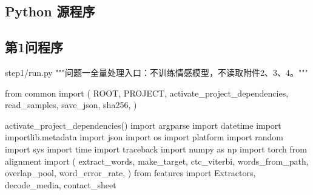 
\clearpage
\begin{appendices}

\section{Python 源程序}
\label{app:tail-code}
\renewcommand{\thesubsection}{\Alph{section}\thinspace.\thinspace\arabic{subsection}}

\subsection{第1问程序}
\vspace{-2ex}

\begin{Python}{step1/run.py}
"""问题一全量处理入口：不训练情感模型，不读取附件2、3、4。"""

from common import (
    ROOT,
    PROJECT,
    activate_project_dependencies,
    read_samples,
    save_json,
    sha256,
)

activate_project_dependencies()
import argparse
import datetime
import importlib.metadata
import json
import os
import platform
import random
import sys
import time
import traceback
import numpy as np
import torch
from alignment import (
    extract_words,
    make_target,
    ctc_viterbi,
    words_from_path,
    overlap_pool,
    word_error_rate,
)
from features import Extractors, decode_media, contact_sheet



\end{Python}
\end{appendices}
